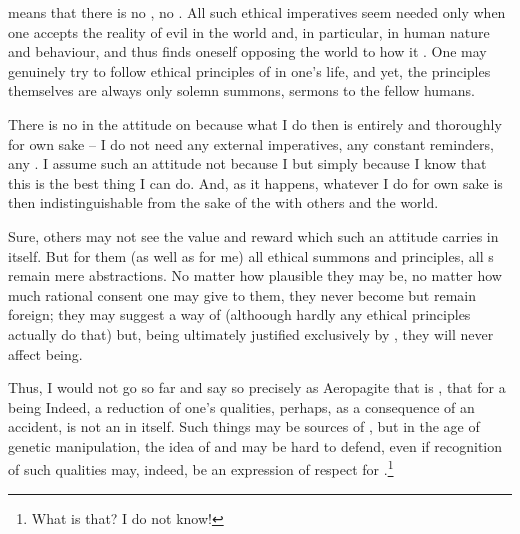 {{

\pa\label{pa:noYouShalt}
 means that there is no
, no .  All such ethical imperatives seem
needed only when one accepts the reality of evil in the world and,
in particular, in human nature and behaviour, and thus finds oneself
opposing the world  to how it . One may 
genuinely try to follow ethical principles of  in one's life, 
and yet, the principles themselves are always only 
solemn summons, sermons to the fellow humans. 

There is no  in the attitude  on 
because what I do then is entirely and thoroughly for  own sake
-- I do not need any external imperatives, any constant reminders, any
.  I assume such an attitude not because I
 but simply because I know that this is the best thing I
can do.  And, as it happens, whatever I do for  own sake is
then indistinguishable from the sake of the  with others
and the world. 

Sure, others may not see the value and reward which such an attitude
carries in itself.  But for them (as well as for me) all ethical
summons and principles, all s remain mere 
abstractions.  No matter how plausible they may be, no matter how much
rational consent one may give to them, they never become  but
remain foreign; they may suggest a way of  (althoough 
hardly any ethical principles actually do that) but, being
ultimately justified exclusively by , they will never
affect  being.



\pa
Thus, I would not go so far and say so precisely as Aeropagite that 
 is , that for a being  
Indeed, a reduction of one's qualities, perhaps, as a 
consequence of an accident, is not an  in itself.
Such things may 
be sources of , but in the age of genetic manipulation, the 
idea of  and  may be hard to 
defend, even if recognition of such qualities may, indeed, be an expression 
of respect for .\footnote{What is that? I do 
not know! }

}}
